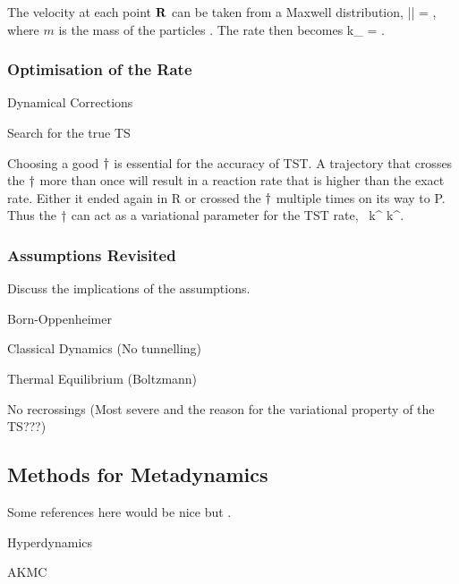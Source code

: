 The velocity at each point ${\mathrm{\mathbf{\bm{R}}}}$ can be taken from a Maxwell distribution, 
\langle || \rangle = ,
\eeq
where $m$ is the mass of the particles .
The rate then becomes
k_ =  . \quad \text{\expand}
\eeq

\placeholder

\subsubsection{Optimisation of the Rate}
\bit
\item Dynamical Corrections
\item Search for the true TS
\eit

Choosing a good $\dagger$ is essential for the accuracy of TST.
A trajectory that crosses the $\dagger$ more than once will result in a reaction rate that is higher than the exact rate.
Either it ended again in R or crossed the $\dagger$ multiple times on its way to P.
Thus the $\dagger$ can act as a variational parameter for the TST rate,~\cite{vtst-1938, vtst-review-1984, vtst-2005}
k^ \ge k^.
\eeq

\incomplete

\subsubsection{Assumptions Revisited}
Discuss the implications of the assumptions.
\bit
\item Born-Oppenheimer
\item Classical Dynamics (No tunnelling)
\item Thermal Equilibrium (Boltzmann)
\item No recrossings (Most severe and the reason for the variational property of the TS???)
\eit
\placeholder

%

\subsection{Methods for Metadynamics}
\bit
\item Some references here would be nice but .
\item Hyperdynamics
\item AKMC
\eit
\placeholder


